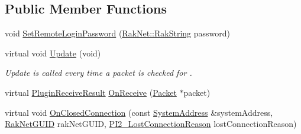 \subsection*{Public Member Functions}
\begin{DoxyCompactItemize}
\item 
void \hyperlink{class_rak_net_1_1_u_d_p_proxy_coordinator_adce074b9622b9f8940d5da1e22d2e827}{Set\-Remote\-Login\-Password} (\hyperlink{class_rak_net_1_1_rak_string}{Rak\-Net\-::\-Rak\-String} password)
\item 
\hypertarget{class_rak_net_1_1_u_d_p_proxy_coordinator_a7b4d697fb8ac5d0a022a2a317aad08ce}{virtual void \hyperlink{class_rak_net_1_1_u_d_p_proxy_coordinator_a7b4d697fb8ac5d0a022a2a317aad08ce}{Update} (void)}\label{class_rak_net_1_1_u_d_p_proxy_coordinator_a7b4d697fb8ac5d0a022a2a317aad08ce}

\begin{DoxyCompactList}\small\item\em Update is called every time a packet is checked for . \end{DoxyCompactList}\item 
virtual \hyperlink{group___p_l_u_g_i_n___i_n_t_e_r_f_a_c_e___g_r_o_u_p_ga89998adaafb29e5d879113b992161085}{Plugin\-Receive\-Result} \hyperlink{class_rak_net_1_1_u_d_p_proxy_coordinator_a5be9954434489ab6c0004db520fc9447}{On\-Receive} (\hyperlink{struct_rak_net_1_1_packet}{Packet} $\ast$packet)
\item 
virtual void \hyperlink{class_rak_net_1_1_u_d_p_proxy_coordinator_ac5998f29e20816a2e3f29d6a4d17a78d}{On\-Closed\-Connection} (const \hyperlink{struct_rak_net_1_1_system_address}{System\-Address} \&system\-Address, \hyperlink{struct_rak_net_1_1_rak_net_g_u_i_d}{Rak\-Net\-G\-U\-I\-D} rak\-Net\-G\-U\-I\-D, \hyperlink{group___p_l_u_g_i_n___i_n_t_e_r_f_a_c_e___g_r_o_u_p_ga376cc546fd6892c2ead48cd51796c8b8}{P\-I2\-\_\-\-Lost\-Connection\-Reason} lost\-Connection\-Reason)
\end{DoxyCompactItemize}

